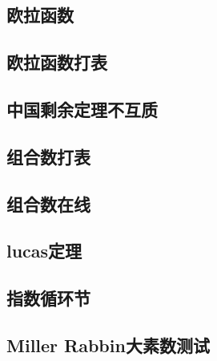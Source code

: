 \subsection{欧拉函数}


\subsection{欧拉函数打表}


\subsection{中国剩余定理不互质}


\subsection{组合数打表}


\subsection{组合数在线}


\subsection{lucas定理}


\subsection{指数循环节}



\subsection{Miller Rabbin大素数测试}

